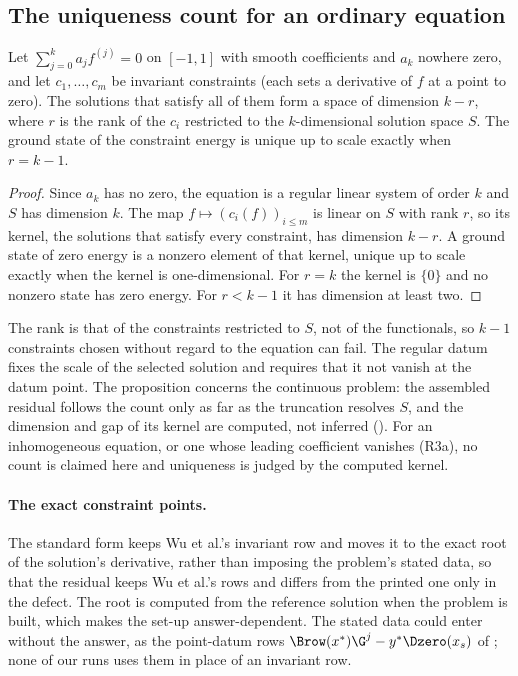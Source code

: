 \subsection{The uniqueness count for an ordinary equation}
\label{app:uniqueness-count}
\begin{proposition}
    \label{prop:uniqueness-count}
    Let $\sum_{j=0}^{k}a_j f^{(j)}=0$ on $[-1,1]$ with smooth coefficients and $a_k$ nowhere zero, and let $c_1,\dots,c_m$ be invariant constraints (each sets a derivative of $f$ at a point to zero). The solutions that satisfy all of them form a space of dimension $k-r$, where $r$ is the rank of the $c_i$ restricted to the $k$-dimensional solution space $S$. The ground state of the constraint energy is unique up to scale exactly when $r=k-1$.
\end{proposition}
\begin{proof}
    Since $a_k$ has no zero, the equation is a regular linear system of order $k$ and $S$ has dimension $k$. The map $f\mapsto(c_i(f))_{i\le m}$ is linear on $S$ with rank $r$, so its kernel, the solutions that satisfy every constraint, has dimension $k-r$. A ground state of zero energy is a nonzero element of that kernel, unique up to scale exactly when the kernel is one-dimensional. For $r=k$ the kernel is $\{0\}$ and no nonzero state has zero energy. For $r<k-1$ it has dimension at least two.
\end{proof}
The rank is that of the constraints restricted to $S$, not of the functionals, so $k-1$ constraints chosen without regard to the equation can fail. The regular datum fixes the scale of the selected solution and requires that it not vanish at the datum point. The proposition concerns the continuous problem: the assembled residual follows the count only as far as the truncation resolves $S$, and the dimension and gap of its kernel are computed, not inferred (). For an inhomogeneous equation, or one whose leading coefficient vanishes (R3a), no count is claimed here and uniqueness is judged by the computed kernel.

\paragraph{The exact constraint points.} \label{app:exact-points}The standard form keeps Wu et al.'s invariant row and moves it to the exact root of the solution's derivative, rather than imposing the problem's stated data, so that the residual keeps Wu et al.'s rows and differs from the printed one only in the defect. The root is computed from the reference solution when the problem is built, which makes the set-up answer-dependent. The stated data could enter without the answer, as the point-datum rows $\Brow(x^*)\G^{j}-y^*\Dzero(x_s)$ of ; none of our runs uses them in place of an invariant row.

